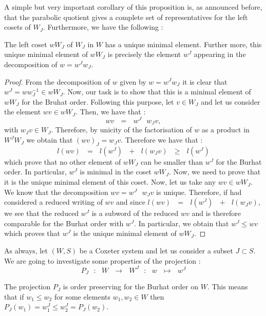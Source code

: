 \documentclass[envcountsame,envcountchap]{svmono}
\newcommand{\sub}{\subset}
\newcommand{\fct}[4]{\qq:\qq #1\qq\longrightarrow\qq #2\qq :\qq #3\qq \mapsto\qq #4}
\newcommand{\qq}{\text{ }}
\begin{document}
A simple but very important corollary of this proposition is, as announced before, that the parabolic quotient gives a complete set of representatives for the left cosets of $W_J$. Furthermore, we have the following :
\begin{corollary}
	The left coset $wW_J$ of $W_J$ in $W$ has a unique minimal element. Further more, this unique minimal element of $wW_J$ is precisely the element $w^J$ appearing in the decomposition of $w=w^Jw_J$. 
\end{corollary}
\begin{proof}
	From the decomposition of $w$ given by $w=w^Jw_J$ it is clear that $w^J=ww_J^{-1}\in wW_J$. Now, our task is to show that this is a minimal element of $wW_J$ for the Bruhat order. Following this purpose, let $v\in W_J$ and let us consider the element $wv\in wW_J$. Then, we have that :
	\begin{equation}
	wv\qq=\qq w^J\qq w_Jv,
	\end{equation}
	with $w_Jv\in W_J$. Therefore, by unicity of the factorisation of $w$ as a product in $W^JW_J$ we obtain that $(wv)_J=  w_Jv$. Therefore we have that :
	\begin{equation}
	l(wv)\qq=\qq l(w^J)\qq+\qq l(w_Jv)\qq \geq \qq l(w^J)
	\end{equation}
	which prove that no other element of $wW_J$ can be smaller than $w^J$ for the Burhat order. In particular, $w^J$ is minimal in the coset $wW_J$. Now, we need to prove that it is the unique minimal element of this coset. Now, let us take any $wv\in wW_J$. We know that the decomposition $wv=w^J\qq w_Jv$ is unique. Therefore, if had considered a reduced writing of $wv$ and since $l(wv)\qq=\qq l(w^J)\qq+\qq l(w_Jv)$, we see that the reduced $w^J$ is a subword of the reduced $wv$ and is therefore comparable for the Burhat order with $w^J$. In particular, we obtain that $w^J\leq wv$ which proves that $w^J$ is the unique minimal element of $wW_J$.
\end{proof}
As always, let $(W,S)$ be a Coxeter system and let us consider a subset $J\sub S$. We are going to investigate some properties of the projection :
\begin{equation}
P_J\fct{W}{W^J}{w}{w^J}
\end{equation} 
\begin{proposition}
	The projection $P_J$ is order preserving for the Burhat order on $W$. This means that if $w_1\leq w_2$ for some elements $w_1,w_2\in W$ then $P_J(w_1)=w_1^J\leq w_2^J=P_J(w_2)$.
\end{proposition}
\end{document}

